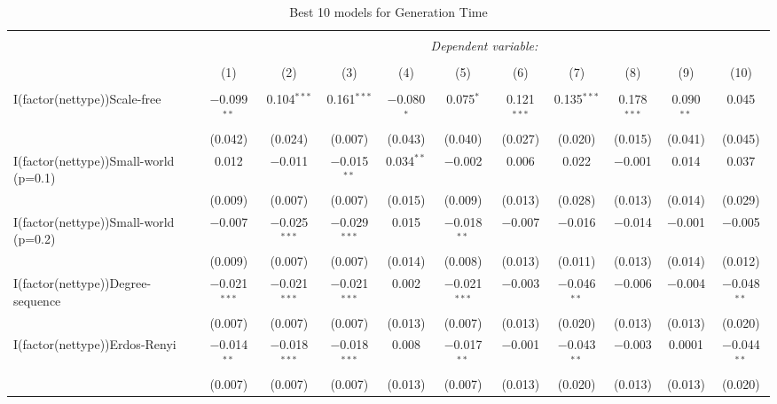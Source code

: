 
\begin{table}[!htbp] \centering 
  \caption{Best 10 models for Generation Time} 
  \label{tab:best_models_gentime} 
\begin{tabular}{@{\extracolsep{5pt}}lcccccccccc} 
\\[-1.8ex]\hline 
\hline \\[-1.8ex] 
 & \multicolumn{10}{c}{\textit{Dependent variable:}} \\ 
\cline{2-11} 
\\[-1.8ex] & (1) & (2) & (3) & (4) & (5) & (6) & (7) & (8) & (9) & (10)\\ 
\hline \\[-1.8ex] 
 I(factor(nettype))Scale-free & $-$0.099$^{**}$ & 0.104$^{***}$ & 0.161$^{***}$ & $-$0.080$^{*}$ & 0.075$^{*}$ & 0.121$^{***}$ & 0.135$^{***}$ & 0.178$^{***}$ & 0.090$^{**}$ & 0.045 \\ 
  & (0.042) & (0.024) & (0.007) & (0.043) & (0.040) & (0.027) & (0.020) & (0.015) & (0.041) & (0.045) \\ 
  I(factor(nettype))Small-world (p=0.1) & 0.012 & $-$0.011 & $-$0.015$^{**}$ & 0.034$^{**}$ & $-$0.002 & 0.006 & 0.022 & $-$0.001 & 0.014 & 0.037 \\ 
  & (0.009) & (0.007) & (0.007) & (0.015) & (0.009) & (0.013) & (0.028) & (0.013) & (0.014) & (0.029) \\ 
  I(factor(nettype))Small-world (p=0.2) & $-$0.007 & $-$0.025$^{***}$ & $-$0.029$^{***}$ & 0.015 & $-$0.018$^{**}$ & $-$0.007 & $-$0.016 & $-$0.014 & $-$0.001 & $-$0.005 \\ 
  & (0.009) & (0.007) & (0.007) & (0.014) & (0.008) & (0.013) & (0.011) & (0.013) & (0.014) & (0.012) \\ 
  I(factor(nettype))Degree-sequence & $-$0.021$^{***}$ & $-$0.021$^{***}$ & $-$0.021$^{***}$ & 0.002 & $-$0.021$^{***}$ & $-$0.003 & $-$0.046$^{**}$ & $-$0.006 & $-$0.004 & $-$0.048$^{**}$ \\ 
  & (0.007) & (0.007) & (0.007) & (0.013) & (0.007) & (0.013) & (0.020) & (0.013) & (0.013) & (0.020) \\ 
  I(factor(nettype))Erdos-Renyi & $-$0.014$^{**}$ & $-$0.018$^{***}$ & $-$0.018$^{***}$ & 0.008 & $-$0.017$^{**}$ & $-$0.001 & $-$0.043$^{**}$ & $-$0.003 & 0.0001 & $-$0.044$^{**}$ \\ 
  & (0.007) & (0.007) & (0.007) & (0.013) & (0.007) & (0.013) & (0.020) & (0.013) & (0.013) & (0.020) \\ 

\end{tabular}
\end{table}
